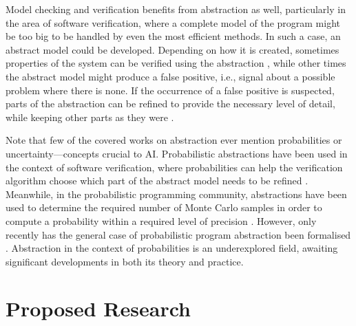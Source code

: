 \documentclass{article}
\begin{document}
Model checking and verification benefits from abstraction as well, particularly
in the area of software verification, where a complete model of the program
might be too big to be handled by even the most efficient methods. In such a
case, an abstract model could be developed. Depending on how it is created,
sometimes properties of the system can be verified using the abstraction
\cite{DBLP:journals/toplas/ClarkeGL94}, while other times the abstract model
might produce a false positive, i.e., signal about a possible problem where
there is none. If the occurrence of a false positive is suspected, parts of the
abstraction can be refined to provide the necessary level of detail, while
keeping other parts as they were
\cite{DBLP:conf/cav/ClarkeGJLV00,DBLP:conf/popl/HenzingerJMS02}.

Note that few of the covered works on abstraction ever mention
probabilities or uncertainty---concepts crucial to AI. Probabilistic
abstractions have been used in the context of software verification, where
probabilities can help the verification algorithm choose which part of the
abstract model needs to be refined \cite{DBLP:conf/pldi/ZhangSN17}. Meanwhile,
in the probabilistic programming \cite{DBLP:conf/icse/GordonHNR14} community,
abstractions have been used to determine the required number of Monte Carlo
samples in order to compute a probability within a required level of precision
\cite{DBLP:conf/popl/Monniaux01}. However, only recently has the general case of
probabilistic program abstraction been formalised
\cite{DBLP:conf/uai/HoltzenMB17}. Abstraction in the context of probabilities is
an underexplored field, awaiting significant developments in both its theory and
practice.

\section{Proposed Research}
\end{document}
